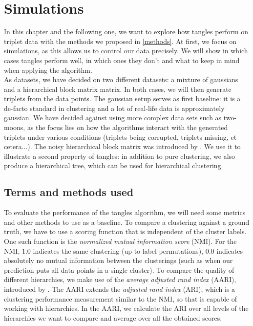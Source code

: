 \chapter{Simulations}\label{simulations}
In this chapter and the following one, we want to explore how tangles perform on triplet data with the methods we proposed in \autoref{methods}. 
At first, we focus on simulations, as this allows us to control our data precisely. 
We will show in which cases tangles perform well, in which ones they don't and what to keep in mind when applying the algorithm. \\

As datasets, we have decided on two different datasets: a mixture of gaussians and a hierarchical block matrix matrix. In both cases, we will then generate triplets from the data points.
The gaussian setup serves as first baseline: it is a de-facto standard in clustering and a lot of real-life data is approximately gaussian. 
We have decided against using more complex data sets such as two-moons, as the focus lies on how the algorithms
interact with the generated triplets under various conditions (triplets being corrupted, triplets missing, et cetera...). The noisy hierarchical block matrix was introduced by \cite{balakrishnanNoiseThresholdsSpectral2011}.
We use it to illustrate a second property of tangles: in addition to pure clustering, we also produce a hierarchical tree, 
which can be used for hierarchical clustering. 

\section{Terms and methods used}
To evaluate the performance of the tangles algorithm, we will need some metrics and other methods to use as a baseline. To compare a clustering against a ground truth,
we have to use a scoring function that is independent of the cluster labels. One such function is the \textit{normalized mutual information score} (NMI). 
For the NMI, $1.0$ indicates the same clustering (up to label permutations), $0.0$ indicates absolutely no mutual information between the clusterings (such as when our prediction
puts all data points in a single cluster). To compare the quality of different hierarchies, we make use of the \textit{average adjusted rand index} (AARI), 
introduced by \cite{ghoshdastidarFoundationsComparisonBasedHierarchical2019}. The AARI extends the \textit{adjusted rand index} (ARI), which is a clustering performance measurement
similar to the NMI, so that is capable of working with hierarchies. In the AARI, we calculate the ARI over all levels of the hierarchies we want to compare and average over all the obtained scores. 

